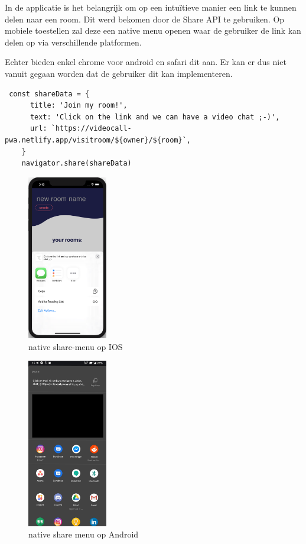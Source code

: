 		In de applicatie is het belangrijk om op een intuïtieve manier een link te kunnen delen naar een room. 
		Dit werd bekomen door de Share API te gebruiken.
		Op mobiele toestellen zal deze een native menu openen waar de gebruiker de link kan delen op via verschillende platformen.
		
		Echter bieden enkel chrome voor android en safari dit aan. Er kan er dus niet vanuit gegaan worden dat de gebruiker dit kan implementeren.

\begin{lstlisting}
 const shareData = {
      title: 'Join my room!',
      text: 'Click on the link and we can have a video chat ;-)',
      url: `https://videocall-pwa.netlify.app/visitroom/${owner}/${room}`,
    }
    navigator.share(shareData)
\end{lstlisting}

		\begin{figure}[H]
			\centering
			\includegraphics[width=35mm]{./img/share-ios}{}
			\caption{native share-menu op IOS}
		\end{figure}	
		\begin{figure}[H]
			\centering
			\includegraphics[width=35mm]{./img/share-android.jpg}{}
			\caption{native share menu op Android}
		\end{figure}

